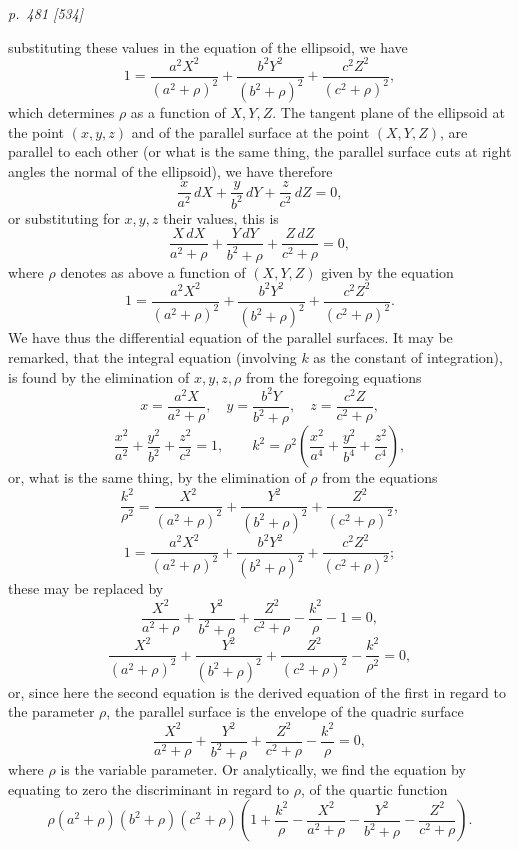 \documentclass[11pt,a4paper]{article}
\theoremstyle{plain}
\theoremstyle{definition}
\newcommand{\dd}{\,d}
\begin{document}
\bigskip
\textit{p.~481 [534]}
\smallskip

\noindent
substituting these values in the equation of the ellipsoid, we have
\[
        1=\frac{a^2X^2}{(a^2+\rho)^2}
         +\frac{b^2Y^2}{(b^2+\rho)^2}
         +\frac{c^2Z^2}{(c^2+\rho)^2},
\]
which determines $\rho$ as a function of $X,Y,Z$. The tangent plane of the
ellipsoid at the point $(x,y,z)$ and of the parallel surface at the point $(X,Y,Z)$,
are parallel to each other (or what is the same thing, the parallel surface cuts at
right angles the normal of the ellipsoid), we have therefore
\[
        \frac{x}{a^2}\dd X+\frac{y}{b^2}\dd Y+\frac{z}{c^2}\dd Z=0,
\]
or substituting for $x,y,z$ their values, this is
\[
        \frac{X\dd X}{a^2+\rho}
       +\frac{Y\dd Y}{b^2+\rho}
       +\frac{Z\dd Z}{c^2+\rho}=0,
\]
where $\rho$ denotes as above a function of $(X,Y,Z)$ given by the equation
\[
        1=\frac{a^2X^2}{(a^2+\rho)^2}
         +\frac{b^2Y^2}{(b^2+\rho)^2}
         +\frac{c^2Z^2}{(c^2+\rho)^2}.
\]
We have thus the differential equation of the parallel surfaces. It may be remarked,
that the integral equation (involving $k$ as the constant of integration), is found by
the elimination of $x,y,z,\rho$ from the foregoing equations
\[
x=\frac{a^2X}{a^2+\rho},\quad
y=\frac{b^2Y}{b^2+\rho},\quad
z=\frac{c^2Z}{c^2+\rho},
\]
\[
\frac{x^2}{a^2}+\frac{y^2}{b^2}+\frac{z^2}{c^2}=1,\qquad
k^2=\rho^2\left(\frac{x^2}{a^4}+\frac{y^2}{b^4}+\frac{z^2}{c^4}\right),
\]
or, what is the same thing, by the elimination of $\rho$ from the equations
\[
\frac{k^2}{\rho^2}
=\frac{X^2}{(a^2+\rho)^2}
 +\frac{Y^2}{(b^2+\rho)^2}
 +\frac{Z^2}{(c^2+\rho)^2},
\]
\[
1=\frac{a^2X^2}{(a^2+\rho)^2}
 +\frac{b^2Y^2}{(b^2+\rho)^2}
 +\frac{c^2Z^2}{(c^2+\rho)^2};
\]
these may be replaced by
\[
\frac{X^2}{a^2+\rho}+\frac{Y^2}{b^2+\rho}+\frac{Z^2}{c^2+\rho}
-\frac{k^2}{\rho}-1=0,
\]
\[
\frac{X^2}{(a^2+\rho)^2}+\frac{Y^2}{(b^2+\rho)^2}
+\frac{Z^2}{(c^2+\rho)^2}-\frac{k^2}{\rho^2}=0,
\]
or, since here the second equation is the derived equation of the first in regard to
the parameter $\rho$, the parallel surface is the envelope of the quadric surface
\[
\frac{X^2}{a^2+\rho}+\frac{Y^2}{b^2+\rho}+\frac{Z^2}{c^2+\rho}
-\frac{k^2}{\rho}=0,
\]
where $\rho$ is the variable parameter. Or analytically, we find the equation by
equating to zero the discriminant in regard to $\rho$, of the quartic function
\[
\rho(a^2+\rho)(b^2+\rho)(c^2+\rho)
\left(1+\frac{k^2}{\rho}-\frac{X^2}{a^2+\rho}
-\frac{Y^2}{b^2+\rho}-\frac{Z^2}{c^2+\rho}\right).
\]

\clearpage
\end{document}

